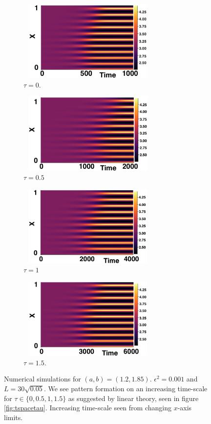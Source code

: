\begin{figure}[H]
    \centering
    \begin{subfigure}[b]{0.45\textwidth}
        \centering
        \includegraphics[width=7cm,height=4cm]{p2t0.png}
        \caption{$\tau=0$.}
        \label{}
    \end{subfigure}
    \hfill
    \begin{subfigure}[b]{0.45\textwidth}
        \centering
        \includegraphics[width=7cm,height=4cm]{p2t05.png}
        \caption{$\tau=0.5$}
        \label{}
    \end{subfigure}
    \hfill
    \begin{subfigure}[b]{0.45\textwidth}
        \centering
        \includegraphics[width=7cm,height=4cm]{p2t1.png}
        \caption{$\tau=1$}
        \label{}
    \end{subfigure}
    \hfill
    \begin{subfigure}[b]{0.45\textwidth}
        \centering
        \includegraphics[width=7cm,height=4cm]{p2t15.png}
        \caption{$\tau=1.5$.}
        \label{}
    \end{subfigure}
    \caption{Numerical simulations for $(a,b)=(1.2,1.85)$. $\epsilon^2=0.001$ and $L=30\sqrt{0.05}$. We see pattern formation on an increasing time-scale for $\tau\in\{0,0.5,1,1.5\}$ as suggested by linear theory, seen in figure \ref{fig:tspacetau}. Increasing time-scale seen from changing $x$-axis limits.}
    \label{fig:testturing3}
\end{figure}

